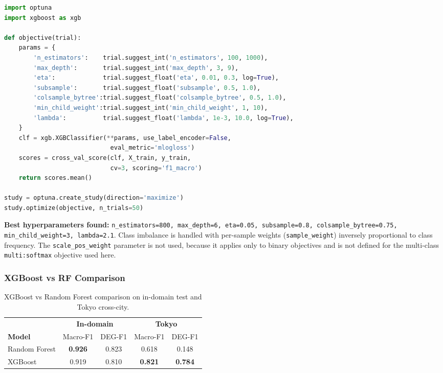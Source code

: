 \documentclass[12pt,a4paper]{article}
\newcommand{\code}[1]{\texttt{#1}}
\begin{document}
\begin{lstlisting}[language=Python,basicstyle=\small\ttfamily,frame=single,
  backgroundcolor=\color{white}]
import optuna
import xgboost as xgb

def objective(trial):
    params = {
        'n_estimators':    trial.suggest_int('n_estimators', 100, 1000),
        'max_depth':       trial.suggest_int('max_depth', 3, 9),
        'eta':             trial.suggest_float('eta', 0.01, 0.3, log=True),
        'subsample':       trial.suggest_float('subsample', 0.5, 1.0),
        'colsample_bytree':trial.suggest_float('colsample_bytree', 0.5, 1.0),
        'min_child_weight':trial.suggest_int('min_child_weight', 1, 10),
        'lambda':          trial.suggest_float('lambda', 1e-3, 10.0, log=True),
    }
    clf = xgb.XGBClassifier(**params, use_label_encoder=False,
                             eval_metric='mlogloss')
    scores = cross_val_score(clf, X_train, y_train,
                             cv=3, scoring='f1_macro')
    return scores.mean()

study = optuna.create_study(direction='maximize')
study.optimize(objective, n_trials=50)
\end{lstlisting}

\textbf{Best hyperparameters found:}
\code{n\_estimators=800, max\_depth=6, eta=0.05, subsample=0.8, colsample\_bytree=0.75,
min\_child\_weight=3, lambda=2.1}.
Class imbalance is handled with per-sample weights (\code{sample\_weight}) inversely
proportional to class frequency. The \code{scale\_pos\_weight} parameter is not used,
because it applies only to binary objectives and is not defined for the multi-class
\code{multi:softmax} objective used here.

\subsubsection{XGBoost vs RF Comparison}

\begin{table}[H]
  \centering
  \caption{XGBoost vs Random Forest comparison on in-domain test and Tokyo cross-city.}
  \begin{tabular}{lcccc}
    \toprule
    & \multicolumn{2}{c}{\textbf{In-domain}} & \multicolumn{2}{c}{\textbf{Tokyo}} \\
    \cmidrule(lr){2-3}\cmidrule(lr){4-5}
    \textbf{Model} & Macro-F1 & DEG-F1 & Macro-F1 & DEG-F1 \\
    \midrule
    Random Forest & \textbf{0.926} & 0.823 & 0.618 & 0.148 \\
    XGBoost       & 0.919          & 0.810 & \textbf{0.821} & \textbf{0.784} \\
    \bottomrule
  \end{tabular}
\end{table}
\end{document}
